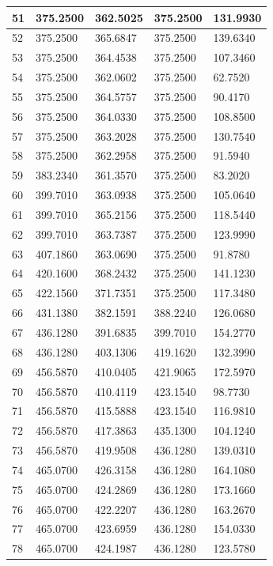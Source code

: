 \begin{longtable}{|l|l|l|l|l|}
51 & 375.2500 & 362.5025 & 375.2500 & 131.9930 \\\hline
52 & 375.2500 & 365.6847 & 375.2500 & 139.6340 \\\hline
53 & 375.2500 & 364.4538 & 375.2500 & 107.3460 \\\hline
54 & 375.2500 & 362.0602 & 375.2500 & 62.7520 \\\hline
55 & 375.2500 & 364.5757 & 375.2500 & 90.4170 \\\hline
56 & 375.2500 & 364.0330 & 375.2500 & 108.8500 \\\hline
57 & 375.2500 & 363.2028 & 375.2500 & 130.7540 \\\hline
58 & 375.2500 & 362.2958 & 375.2500 & 91.5940 \\\hline
59 & 383.2340 & 361.3570 & 375.2500 & 83.2020 \\\hline
60 & 399.7010 & 363.0938 & 375.2500 & 105.0640 \\\hline
61 & 399.7010 & 365.2156 & 375.2500 & 118.5440 \\\hline
62 & 399.7010 & 363.7387 & 375.2500 & 123.9990 \\\hline
63 & 407.1860 & 363.0690 & 375.2500 & 91.8780 \\\hline
64 & 420.1600 & 368.2432 & 375.2500 & 141.1230 \\\hline
65 & 422.1560 & 371.7351 & 375.2500 & 117.3480 \\\hline
66 & 431.1380 & 382.1591 & 388.2240 & 126.0680 \\\hline
67 & 436.1280 & 391.6835 & 399.7010 & 154.2770 \\\hline
68 & 436.1280 & 403.1306 & 419.1620 & 132.3990 \\\hline
69 & 456.5870 & 410.0405 & 421.9065 & 172.5970 \\\hline
70 & 456.5870 & 410.4119 & 423.1540 & 98.7730 \\\hline
71 & 456.5870 & 415.5888 & 423.1540 & 116.9810 \\\hline
72 & 456.5870 & 417.3863 & 435.1300 & 104.1240 \\\hline
73 & 456.5870 & 419.9508 & 436.1280 & 139.0310 \\\hline
74 & 465.0700 & 426.3158 & 436.1280 & 164.1080 \\\hline
75 & 465.0700 & 424.2869 & 436.1280 & 173.1660 \\\hline
76 & 465.0700 & 422.2207 & 436.1280 & 163.2670 \\\hline
77 & 465.0700 & 423.6959 & 436.1280 & 154.0330 \\\hline
78 & 465.0700 & 424.1987 & 436.1280 & 123.5780 \\\hline

\end{longtable}
